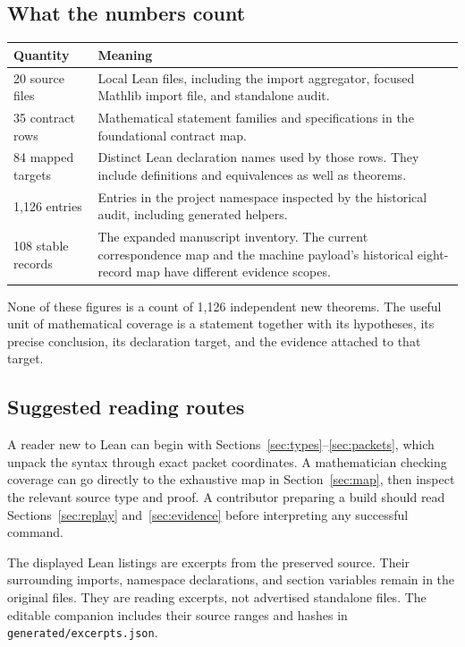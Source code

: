 \documentclass[11pt,a4paper]{article}
\newcommand{\code}[1]{\nolinkurl{#1}}
\begin{document}
\subsection{What the numbers count}

\begin{tabular}{p{}p{}}
\toprule Quantity & Meaning \\\midrule
20 source files & Local Lean files, including the import aggregator, focused Mathlib import file, and standalone audit. \\
35 contract rows & Mathematical statement families and specifications in the foundational contract map. \\
84 mapped targets & Distinct Lean declaration names used by those rows. They include definitions and equivalences as well as theorems. \\
1,126 entries & Entries in the project namespace inspected by the historical audit, including generated helpers. \\
108 stable records & The expanded manuscript inventory. The current correspondence map and the machine payload's historical eight-record map have different evidence scopes. \\
\bottomrule
\end{tabular}

None of these figures is a count of 1,126 independent new theorems. The useful unit of mathematical coverage is a statement together with its hypotheses, its precise conclusion, its declaration target, and the evidence attached to that target.

\subsection{Suggested reading routes}

A reader new to Lean can begin with Sections~\ref{sec:types}--\ref{sec:packets}, which unpack the syntax through exact packet coordinates. A mathematician checking coverage can go directly to the exhaustive map in Section~\ref{sec:map}, then inspect the relevant source type and proof. A contributor preparing a build should read Sections~\ref{sec:replay} and~\ref{sec:evidence} before interpreting any successful command.

The displayed Lean listings are excerpts from the preserved source. Their surrounding imports, namespace declarations, and section variables remain in the original files. They are reading excerpts, not advertised standalone files. The editable companion includes their source ranges and hashes in \code{generated/excerpts.json}.
\end{document}
